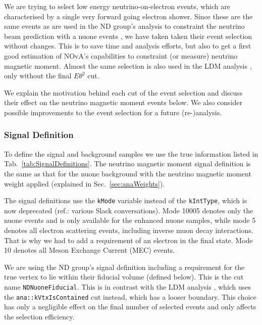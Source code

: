 We are trying to select low energy neutrino-on-electron events, which are characterised by a single very forward going electron shower. Since these are the same events as are used in the \gls{ND} group's analysis to constraint the neutrino beam prediction with a \gls{nuone} events \cite{NOVA-doc-56383}, we have taken taken their event selection without changes. This is to save time and analysis efforts, but also to get a first good estimation of \gls{NOvA}'s capabilities to constraint (or measure) neutrino magnetic moment. Almost the same selection is also used in the \gls{LDM} analysis \cite{NOVA-doc-59439}, only without the final $E\theta^2$ cut.

We explain the motivation behind each cut of the event selection and discuss their effect on the neutrino magnetic moment events below. We also consider possible improvements to the event selection for a future (re-)analysis. 

\subsubsection*{Signal Definition}
To define the signal and background samples we use the true information listed in Tab.~\ref{tab:SignalDefinitions}. The neutrino magnetic moment signal definition is the same as that for the \gls{nuone} background with the neutrino magnetic moment weight applied (explained in Sec.~\ref{sec:anaWeights}). 

The signal definitions use the \texttt{kMode} variable instead of the \texttt{kIntType}, which is now deprecated (ref.: various Slack conversations). Mode 10005 denotes only the \gls{nuone} events and is only available for the enhanced \gls{nuone} samples, while mode 5 denotes all electron scattering events, including inverse muon decay interactions. That is why we had to add a requirement of an electron in the final state. Mode 10 denotes all Meson Exchange Current (MEC) events.

We are using the \gls{ND} group's \cite{NOVA-doc-56383} signal definition including a requirement for the true vertex to lie within their fiducial volume (defined below). This is the cut name \texttt{NDNuoneFiducial}. This is in contrast with the \gls{LDM} analysis \cite{NOVA-doc-59439}, which uses the \texttt{ana::kVtxIsContained} cut instead, which has a looser boundary. This choice has only a negligible effect on the final number of selected events and only affects the selection efficiency.

